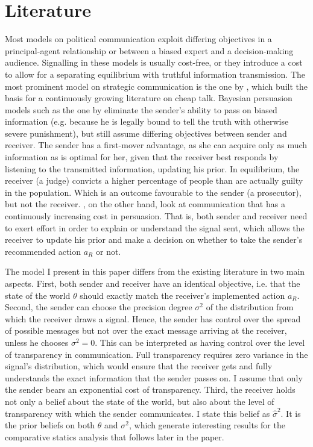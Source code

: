 \documentclass[paper=a4,12pt,DIV=11,twoside=false]{scrartcl}
\begin{document}
\section{Literature}

\noindent Most models on political communication exploit differing objectives in a principal-agent relationship or between a biased expert and a decision-making audience. Signalling in these models is usually cost-free, or they introduce a cost to allow for a separating equilibrium with truthful information transmission. The most prominent model on strategic communication is the one by \citet{CS1982}, which built the basis for a continuously growing literature on cheap talk. Bayesian persuasion models such as the one by \citet{KG2011} eliminate the sender's ability to pass on biased information (e.g. because he is legally bound to tell the truth with otherwise severe punishment), but still assume differing objectives between sender and receiver. The sender has a first-mover advantage, as she can acquire only as much information as is optimal for her, given that the receiver best responds by listening to the transmitted information, updating his prior. In equilibrium, the receiver (a judge) convicts a higher percentage of people than are actually guilty in the population. Which is an outcome favourable to the sender (a prosecutor), but not the receiver. \citet{DT2005}, on the other hand, look at communication that has a continuously increasing cost in persuasion. That is, both sender and receiver need to exert effort in order to explain or understand the signal sent, which allows the receiver to update his prior and make a decision on whether to take the sender's recommended action $a_R$ or not. 

\noindent The model I present in this paper differs from the existing literature in two main aspects. First, both sender and receiver have an identical objective, i.e. that the state of the world $\theta$ should exactly match the receiver's implemented action $a_R$. Second, the sender can choose the precision degree $\sigma^2$ of the distribution from which the receiver draws a signal. Hence, the sender has control over the spread of possible messages but not over the exact message arriving at the receiver, unless he chooses $\sigma^2=0$. This can be interpreted as having control over the level of transparency in communication. Full transparency requires zero variance in the signal's distribution, which would ensure that the receiver gets and fully understands the exact information that the sender passes on. I assume that only the sender bears an exponential cost of transparency. Third, the receiver holds not only a belief about the state of the world, but also about the level of transparency with which the sender communicates. I state this belief as $\hat{\sigma}^2$. It is the prior beliefs on both $\theta$ and $\sigma^2$, which generate interesting results for the comparative statics analysis that follows later in the paper.
\end{document}
